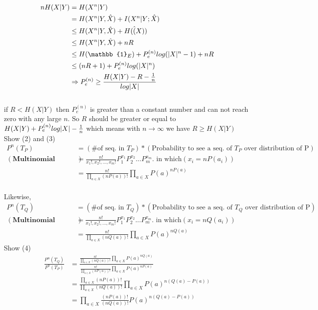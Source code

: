 \documentclass[
  course = {{EE623 Information Theory}},
  quartile = {{Fall 2020}},
  assignment = 4,
  name = {{Mohammad Mahdi Rahimi}},
  studentnumber = {{20208244}},
  email = {{mahi@kaist.ac.kr}},
  firstexercise = 1
]{aga-homework}
\begin{document}
\begin{equation} \label{eq3}
\begin{split}
nH(X|Y) & = H(X^n|Y) \\
& = H(X^n|Y, \hat{X}) + I(X^n|Y; \hat{X})\\
& \le  H(X^n|Y, \hat{X}) + H(\hat(X))\\
& \le  H(X^n|Y, \hat{X}) + nR\\
& \le H(\mathbb{1}_E) + P^{(n)}_e log(|X|^n - 1) + nR\\
& \le (nR + 1) + P^{(n)}_e log(|X|^n)\\
& \Rightarrow P^{(n)}_e \ge \frac{H(X|Y) - R - {1 \over n}}{log|X|}
\end{split}
\end{equation}\\
if $R < H(X|Y)$ then $P^{(n)}_e$ is greater than a constant number and can not reach zero with any large $n$. So $R$ should be greater or equal to $H(X|Y) + P^{(n)}_e log|X| - {1 \over n}$ which means with $n \rightarrow \infty$ we have $R \ge H(X|Y)$
\\
\exercise
\subexercise Show (2) and (3)
\begin{equation} \label{eq3}
\begin{split}
P^n(T_P) & = (\text{\# of seq. in }T_P) * (\text{Probability to see a seq. of } T_P \text{ over distribution of P})\\
(\textbf{Multinomial distribution})& = \frac{n!}{x_1!, x_2!, ..., x_m!}P^{x_1}_1P^{x_2}_2...P^{x_m}_m. \text{ in which} (x_i = nP(a_i))\\
& = \frac{n!}{\prod_{a \in X} (nP(a))!}\prod_{a \in X} P(a)^{nP(a)}
\end{split}
\end{equation}\\
Likewise,\\
\begin{equation} \label{eq3}
\begin{split}
P^n(T_Q) & = (\text{\# of seq. in }T_Q) * (\text{Probability to see a seq. of } T_Q \text{ over distribution of P})\\
(\textbf{Multinomial distribution})& = \frac{n!}{x_1!, x_2!, ..., x_m!}P^{x_1}_1P^{x_2}_2...P^{x_m}_m. \text{ in which} (x_i = nQ(a_i))\\
& = \frac{n!}{\prod_{a \in X} (nQ(a))!}\prod_{a \in X} P(a)^{nQ(a)}
\end{split}
\end{equation}
\subexercise Show (4)\\
\begin{equation} \label{eq3}
\begin{split}
\frac{P^n(T_Q)}{P^n(T_P)} & = \frac{\frac{n!}{\prod_{a \in X} (nQ(a))!}\prod_{a \in X} P(a)^{nQ(a)}} {\frac{n!}{\prod_{a \in X} (nP(a))!}\prod_{a \in X} P(a)^{nP(a)}}\\
& =  \frac{\prod_{a \in X} (nP(a))!} {\prod_{a \in X} (nQ(a))!} \prod_{a \in X} P(a)^{n(Q(a) - P(a))}\\
& = \prod_{a \in X} \frac{ (nP(a))!} {(nQ(a))!} P(a)^{n(Q(a) - P(a))}
\end{split}
\end{equation}
\end{document}
